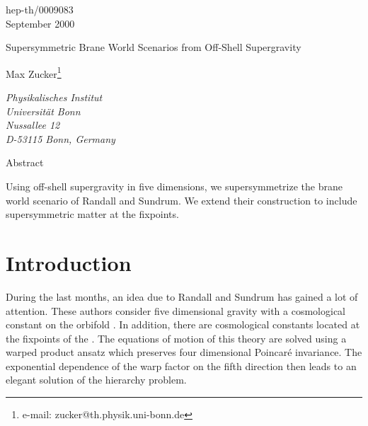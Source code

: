 \documentclass[a4paper,12pt, twoside]{article}
\numberwithin{equation}{section}
\begin{document}
\begin{titlepage}
\begin{center}
\hspace{10cm} hep-th/0009083\\
\hspace{10cm} September 2000\\
\vspace*{2cm}

{ \huge Supersymmetric Brane World Scenarios from Off-Shell 
Supergravity}\\
\vspace{1cm}

{\sc Max Zucker}\footnote{e-mail: zucker@th.physik.uni-bonn.de}
\vspace{.2cm}

{\it { Physikalisches Institut \\
Universit\"at Bonn\\
Nussallee 12\\
D-53115 Bonn, Germany}}\\

\vspace{1.2cm}

\vspace{.3cm}

{\large Abstract}
\end{center}

Using \coordHE{} off-shell supergravity in five dimensions, we 
supersymmetrize the brane world scenario of Randall and Sundrum. We extend their 
construction to include supersymmetric matter at the fixpoints.

%
%
\end{titlepage}
\section{Introduction}
During the last months, an idea due to Randall and Sundrum 
\cite{Randall:1999ee} has gained a lot of attention. These authors consider five 
dimensional gravity with a cosmological constant on the orbifold 
\coordHE{}. In addition, there are cosmological constants located at 
the fixpoints of the \coordHE{}. The equations of motion of this 
theory are solved using a warped product ansatz which preserves four 
dimensional Poincar\'e invariance. The exponential dependence of the warp 
factor on the fifth direction then leads to an elegant solution of the 
hierarchy problem. 
\end{document}
